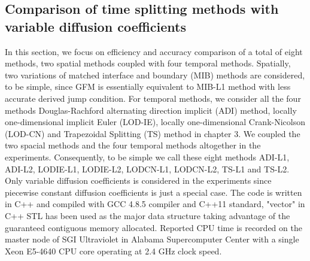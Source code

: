\documentclass[dissertation]{uathesis}
\begin{document}
\begin{body}
\section{Comparison of time splitting methods with variable diffusion coefficients}
In this section, we focus on efficiency and accuracy comparison of a total of eight methods, two spatial methods coupled with four temporal methods. Spatially, two variations of matched interface and boundary (MIB) methods are considered, to be simple, since GFM is essentially equivalent to MIB-L1 method with less accurate derived jump condition. For temporal methods, we consider all the four methods Douglas-Rachford alternating direction implicit (ADI) method, locally one-dimensional implicit Euler (LOD-IE), locally one-dimensional Crank-Nicolson (LOD-CN) and Trapezoidal Splitting (TS) method in chapter 3. We coupled the two spacial methods and the four temporal methods altogether in the experiments. Consequently, to be simple we call these eight methods ADI-L1, ADI-L2, LODIE-L1, LODIE-L2, LODCN-L1, LODCN-L2, TS-L1 and TS-L2. Only variable diffusion coefficients is considered in the experiments since piecewise constant diffusion coefficients is just a special case. The code is written in C++ and compiled with GCC 4.8.5 compiler and C++11 standard, "vector" in C++ STL has been used as the major data structure taking advantage of the guaranteed contiguous memory allocated. Reported CPU time is recorded on the master node of SGI Ultraviolet in Alabama Supercomputer Center with a single Xeon E5-4640 CPU core operating at 2.4 GHz clock speed.


\end{body}
\end{document}
